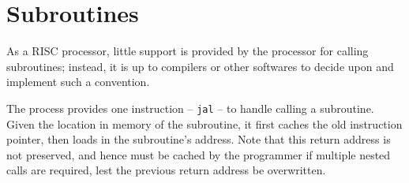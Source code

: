 \documentclass[10pt]{article}
\begin{document}
%
%
%
%
%
%
%
%

    \section{Subroutines}\label{sec:subroutines}

    As a RISC processor, little support is provided by the processor for calling subroutines;
    instead, it is up to compilers or other softwares to decide upon and implement such a convention.

    The process provides one instruction -- \texttt{jal} -- to handle calling a subroutine.
    Given the location in memory of the subroutine, it first caches the old instruction pointer, then loads in the subroutine's address.
    Note that this return address is not preserved, and hence must be cached by the programmer if multiple nested calls are required, lest the previous return address be overwritten.
\end{document}
